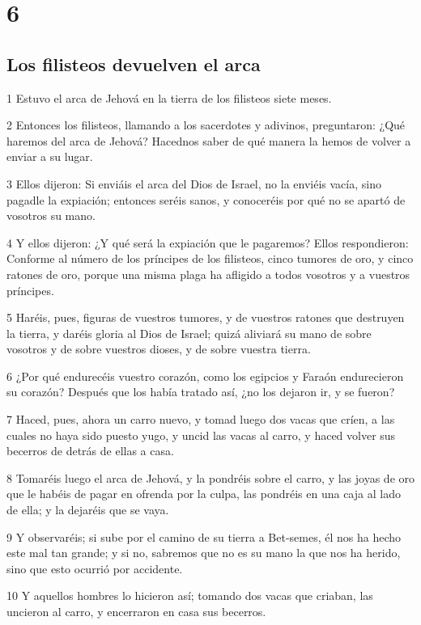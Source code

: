 \chapter{6}

\section*{Los filisteos devuelven el arca}

\par 1 Estuvo el arca de Jehová en la tierra de los filisteos siete meses.
\par 2 Entonces los filisteos, llamando a los sacerdotes y adivinos, preguntaron: ¿Qué haremos del arca de Jehová? Hacednos saber de qué manera la hemos de volver a enviar a su lugar.
\par 3 Ellos dijeron: Si enviáis el arca del Dios de Israel, no la enviéis vacía, sino pagadle la expiación; entonces seréis sanos, y conoceréis por qué no se apartó de vosotros su mano.
\par 4 Y ellos dijeron: ¿Y qué será la expiación que le pagaremos? Ellos respondieron: Conforme al número de los príncipes de los filisteos, cinco tumores de oro, y cinco ratones de oro, porque una misma plaga ha afligido a todos vosotros y a vuestros príncipes.
\par 5 Haréis, pues, figuras de vuestros tumores, y de vuestros ratones que destruyen la tierra, y daréis gloria al Dios de Israel; quizá aliviará su mano de sobre vosotros y de sobre vuestros dioses, y de sobre vuestra tierra.
\par 6 ¿Por qué endurecéis vuestro corazón, como los egipcios y Faraón endurecieron su corazón? Después que los había tratado así, ¿no los dejaron ir, y se fueron?
\par 7 Haced, pues, ahora un carro nuevo, y tomad luego dos vacas que críen, a las cuales no haya sido puesto yugo, y uncid las vacas al carro, y haced volver sus becerros de detrás de ellas a casa.
\par 8 Tomaréis luego el arca de Jehová, y la pondréis sobre el carro, y las joyas de oro que le habéis de pagar en ofrenda por la culpa, las pondréis en una caja al lado de ella; y la dejaréis que se vaya.
\par 9 Y observaréis; si sube por el camino de su tierra a Bet-semes, él nos ha hecho este mal tan grande; y si no, sabremos que no es su mano la que nos ha herido, sino que esto ocurrió por accidente.
\par 10 Y aquellos hombres lo hicieron así; tomando dos vacas que criaban, las uncieron al carro, y encerraron en casa sus becerros.
